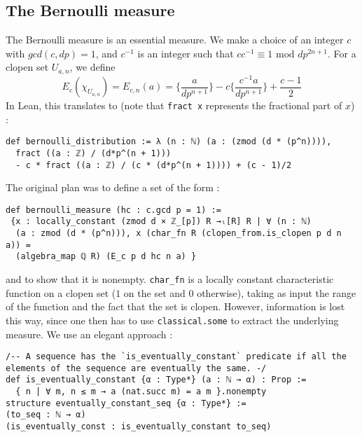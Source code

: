 \documentclass[a4paper,UKenglish,cleveref, autoref, thm-restate,pdfa]{lipics-v2021}
\newcommand{\lean}[1]{\texttt{#1}\xspace} %
\begin{document}
\subsection{The Bernoulli measure}
The Bernoulli measure is an essential measure. We make a choice of an integer $c$ with
$gcd(c,dp) = 1$, and $c^{-1}$ is an integer such that $c c^{-1} \equiv 1 \text{ mod } dp^{2n+1}$.
For a clopen set $U_{a,n}$, we define
$$ E_c (\chi_{U_{a,n}}) = E_{c,n} (a) = \bigg\{ \frac{a}{dp^{n + 1}} \bigg\} - c \bigg\{ \frac{c^{-1}a}{dp^{n + 1}} \bigg\} + \frac{c - 1}{2} $$
In Lean, this translates to (note that \lean{fract x} represents the fractional part of $x$) :
\begin{lstlisting}
def bernoulli_distribution := λ (n : ℕ) (a : (zmod (d * (p^n)))), 
  fract ((a : ℤ) / (d*p^(n + 1))) 
  - c * fract ((a : ℤ) / (c * (d*p^(n + 1)))) + (c - 1)/2
\end{lstlisting}
The original plan was to define a set of the form : 
\begin{lstlisting}
def bernoulli_measure (hc : c.gcd p = 1) :=
 {x : locally_constant (zmod d × ℤ_[p]) R →ₗ[R] R | ∀ (n : ℕ) 
  (a : zmod (d * (p^n))), x (char_fn R (clopen_from.is_clopen p d n a)) = 
  (algebra_map ℚ R) (E_c p d hc n a) }
\end{lstlisting}
and to show that it is nonempty. \lean{char\_fn} is a locally constant characteristic function on a clopen set ($1$ on the set and $0$ otherwise), 
taking as input the range of the function and the fact that the set is clopen. However, information is lost this way, since one then has to use 
\lean{classical.some} to extract the underlying measure. We use an elegant approach :
\begin{lstlisting}
/-- A sequence has the `is_eventually_constant` predicate if all the elements of the sequence are eventually the same. -/
def is_eventually_constant {α : Type*} (a : ℕ → α) : Prop := 
  { n | ∀ m, n ≤ m → a (nat.succ m) = a m }.nonempty
structure eventually_constant_seq {α : Type*} :=
(to_seq : ℕ → α) 
(is_eventually_const : is_eventually_constant to_seq)
\end{lstlisting}
\end{document}
